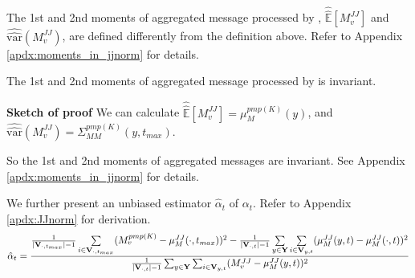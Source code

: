 The 1st and 2nd moments of aggregated message processed by \JJnorm, $\hat{\hat{\mathbb E}}\left[M_v^{JJ}\right]$ and $\hat{\hat{\text{var}}}\left(M_v^{JJ}\right)$, are defined differently from the definition above. Refer to Appendix \ref{apdx:moments_in_jjnorm} for details.

\begin{theorem}\label{thm:jj}
The 1st and 2nd moments of aggregated message processed by \JJnorm is invariant.

\vspace{-5pt}

\textbf{Sketch of proof} We can calculate $\hat{\hat{\mathbb E}}\left[M_v^{JJ}\right]=\mu_{M}^{pmp(K)}(y)$, and $\hat{\hat{\text{var}}}\left(M_v^{JJ}\right)=\Sigma^{pmp(K)}_{MM}(y,t_{max})$.


So the 1st and 2nd moments of aggregated messages are invariant. See Appendix \ref{apdx:moments_in_jjnorm} for details.

\end{theorem}

\vspace{-10pt}
We further present an unbiased estimator $\hat{\alpha}_{t}$ of $\alpha_{t}$. Refer to Appendix \ref{apdx:JJnorm} for derivation.
{\scriptsize
\begin{align}
\hat{\alpha}_t = { {1\over \mid{\bold{V}_{\cdot,t_{max}}}\mid-1}\sum\limits_{i\in \bold{V}_{\cdot,t_{max}}}(M_v^{pmp(K)}-\mu_M^{JJ}(\cdot,t_{max}))^2  -{1\over \mid{\bold{V}_{\cdot,t}}\mid-1} \sum\limits_{y\in \bold{Y}}\sum\limits_{i \in \bold{V}_{y,t}}(\mu_M^{JJ}(y,t) -\mu_M^{JJ}(\cdot,t) )^2  \over{1\over \mid{\bold{V}_{\cdot,t}}\mid-1} \sum_{y\in\bold{Y}} \sum_{i \in \bold{V}_{y,t}}(M_v^{JJ}-\mu_M^{JJ}(y,t))^2}
\end{align}
}%
\vspace{-5pt}

